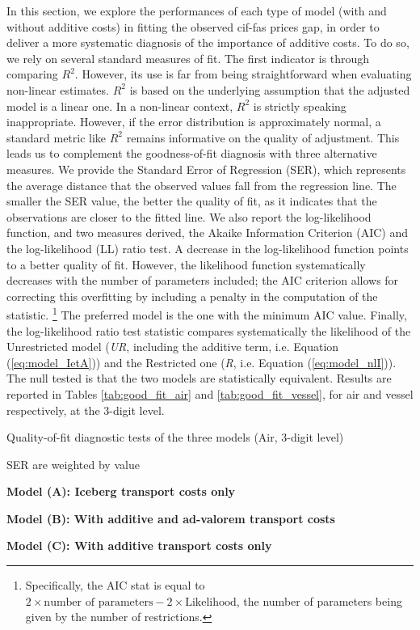 \documentclass[a4paper,11pt]{article}
\begin{document}
In this section, we explore the performances of each type of model (with and without additive costs) in fitting the observed cif-fas prices gap, in order to deliver a more systematic diagnosis of the importance of additive costs.
To do so, we rely on several standard measures of fit.
The first indicator is through comparing $R^{2}$.
However, its use is far from being straightforward when evaluating non-linear estimates.
$R^2$ is based on the underlying assumption that the adjusted model is a linear one.
In a non-linear context, $R^2$ is strictly speaking inappropriate.
However, if the error distribution is approximately normal, a standard metric like $R^2$ remains informative on the quality of adjustment.
This leads us to complement the goodness-of-fit diagnosis with three alternative measures.
We provide the Standard Error of Regression (SER), which represents the average distance that the observed values fall from the regression line.
The smaller the SER value, the better the quality of fit, as it indicates that the observations are closer to the fitted line.
We also report the log-likelihood function, and two measures derived, the Akaike Information Criterion (AIC) and the log-likelihood (LL) ratio test.
A decrease in the log-likelihood function points to a better quality of fit.
However, the likelihood function systematically decreases with the number of parameters included; the AIC criterion allows for correcting this overfitting by including a penalty in the computation of the statistic. \footnote{Specifically, the AIC stat is equal to $2 \times \textrm{number of parameters} - 2 \times \textrm{Likelihood} $, the number of parameters being given by the number of restrictions.}
The preferred model is the one with the minimum AIC value.
Finally, the log-likelihood ratio test statistic compares systematically the likelihood of the Unrestricted model (\emph{UR}, including the additive term, i.e.
Equation (\ref{eq:model_IetA})) and the Restricted one (\emph{R}, i.e.
Equation (\ref{eq:model_nlI})).
The null tested is that the two models are statistically equivalent.
Results are reported in Tables \ref{tab:good_fit_air} and \ref{tab:good_fit_vessel}, for air and vessel respectively, at the 3-digit level.

\begin{table}[htbp]
\centering
\footnotesize{
	\caption{Quality-of-fit diagnostic tests of the three models (Air, 3-digit level)}\vspace{5mm}
	\label{tab:good_fit_air}%
	
\begin{tablenotes}
	\tiny
	\item SER are weighted by value
	\item \textbf{Model (A): Iceberg transport costs only}
	\item \textbf{Model (B): With additive and ad-valorem transport costs}
	\item \textbf{Model (C): With additive transport costs only}
\end{tablenotes}
}
\end{table}%
\end{document}

